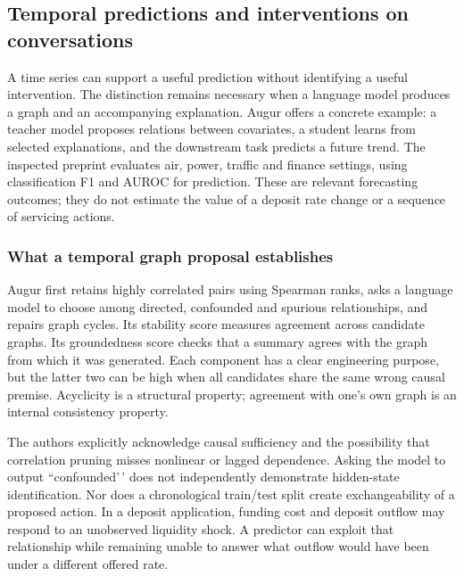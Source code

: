 \hypertarget{temporal-predictions-and-interventions-on-conversations}{%
\subsection{Temporal predictions and interventions on
conversations}\label{temporal-predictions-and-interventions-on-conversations}}

\label{exec13:census-temporal}

A time series can support a useful prediction without identifying a
useful intervention. The distinction remains necessary when a language
model produces a graph and an accompanying explanation. Augur offers a
concrete example: a teacher model proposes relations between covariates,
a student learns from selected explanations, and the downstream task
predicts a future trend. The inspected preprint evaluates air, power,
traffic and finance settings, using classification F1 and AUROC for
prediction. These are relevant forecasting outcomes; they do not
estimate the value of a deposit rate change or a sequence of servicing
actions. \cite{exec13_census_augur_arxiv}

\hypertarget{what-a-temporal-graph-proposal-establishes}{%
\subsubsection{What a temporal graph proposal
establishes}\label{what-a-temporal-graph-proposal-establishes}}

Augur first retains highly correlated pairs using Spearman ranks, asks a
language model to choose among directed, confounded and spurious
relationships, and repairs graph cycles. Its stability score measures
agreement across candidate graphs. Its groundedness score checks that a
summary agrees with the graph from which it was generated. Each
component has a clear engineering purpose, but the latter two can be
high when all candidates share the same wrong causal premise. Acyclicity
is a structural property; agreement with one's own graph is an internal
consistency property. \cite{exec13_census_augur_arxiv}

The authors explicitly acknowledge causal sufficiency and the
possibility that correlation pruning misses nonlinear or lagged
dependence. Asking the model to output ``confounded'\,' does not
independently demonstrate hidden-state identification. Nor does a
chronological train/test split create exchangeability of a proposed
action. In a deposit application, funding cost and deposit outflow may
respond to an unobserved liquidity shock. A predictor can exploit that
relationship while remaining unable to answer what outflow would have
been under a different offered rate.

